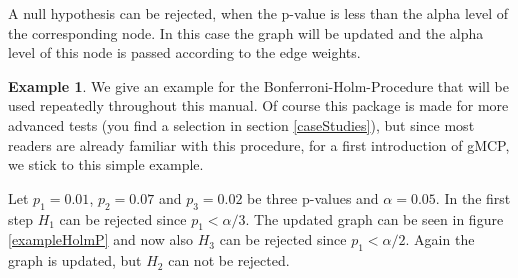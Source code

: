 \documentclass[a4paper, 11pt]{article}
\numberwithin{equation}{section}
\theoremstyle{definition}
\newtheorem{Example}[Def]{Example}
\theoremstyle{plain}
\begin{document}
A null hypothesis can be rejected, when the p-value is less than the
alpha level of the corresponding node.  In this case the graph will be
updated and the alpha level of this node is passed according to the
edge weights.

\begin{Example}
  We give an example for the Bonferroni-Holm-Procedure that will
  be used repeatedly throughout this manual. Of course this 
  package is made for more advanced tests (you find a selection in 
  section \ref{caseStudies}),
  but since most readers are already familiar with this procedure,
  for a first introduction of gMCP, we stick to this simple example.  
  
  Let $p_1=0.01$, $p_2=0.07$ and $p_3=0.02$ be three p-values and
  $\alpha=0.05$.  In the first step $H_1$ can be rejected since
  $p_1<\alpha/3$.  The updated graph can be seen in figure
  \ref{exampleHolmP} and now also $H_3$ can be rejected since
  $p_1<\alpha/2$.  Again the graph is updated, but $H_2$
  can not be rejected.
\end{Example}
\end{document}
